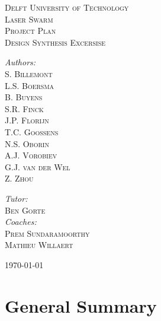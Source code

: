 \documentclass[11pt]{report}
\begin{document}
%
%

\begin{titlepage}
\begin{center}

\textsc{\LARGE Delft University of Technology}\\[1.5cm]

\textsc{\Huge Laser Swarm}\\[0.5cm]
\textsc{\small Project Plan}\\[1.5cm]
\textsc{\large Design Synthesis Excersise}\\[2.5cm]

\begin{minipage}{0.4\textwidth}
\begin{flushleft} \large
\emph{Authors:}\\
\textsc{S. Billemont\\
L.S. Boersma\\
B. Buyens\\
S.R. Finck\\
J.P. Florijn\\
T.C. Goossens\\
N.S. Oborin\\
A.J. Vorobiev\\
G.J. van der Wel\\
Z. Zhou\\}
\end{flushleft}
\end{minipage}
\begin{minipage}{0.4\textwidth}
\begin{flushright}
\emph{Tutor:}\\
\textsc{Ben Gorte}\\[1cm]
\emph{Coaches:}\\
\textsc{Prem Sundaramoorthy\\
Mathieu Willaert}
\end{flushright}
\end{minipage}
\vfill

\today
\end{center}
\end{titlepage}

%
%



%
%

\tableofcontents

%
%
\chapter{General Summary}
\label{dseSummary}
\end{document}
